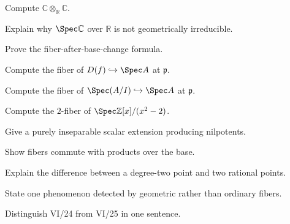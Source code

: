 \begin{exercise}\label{exr:vi25-16}
Compute $\mathbb C\otimes_{\mathbb R}\mathbb C$.
\end{exercise}
\begin{exercise}\label{exr:vi25-17}
Explain why $\Spec\mathbb C$ over $\mathbb R$ is not geometrically irreducible.
\end{exercise}
\begin{exercise}\label{exr:vi25-18}
Prove the fiber-after-base-change formula.
\end{exercise}
\begin{exercise}\label{exr:vi25-19}
Compute the fiber of $D(f)\hookrightarrow\Spec A$ at $\mathfrak p$.
\end{exercise}
\begin{exercise}\label{exr:vi25-20}
Compute the fiber of $\Spec(A/I)\hookrightarrow\Spec A$ at $\mathfrak p$.
\end{exercise}
\begin{exercise}\label{exr:vi25-21}
Compute the $2$-fiber of $\Spec\mathbb Z[x]/(x^2-2)$.
\end{exercise}
\begin{exercise}\label{exr:vi25-22}
Give a purely inseparable scalar extension producing nilpotents.
\end{exercise}
\begin{exercise}\label{exr:vi25-23}
Show fibers commute with products over the base.
\end{exercise}
\begin{exercise}\label{exr:vi25-24}
Explain the difference between a degree-two point and two rational points.
\end{exercise}
\begin{exercise}\label{exr:vi25-25}
State one phenomenon detected by geometric rather than ordinary fibers.
\end{exercise}
\begin{exercise}\label{exr:vi25-26}
Distinguish VI/24 from VI/25 in one sentence.
\end{exercise}
